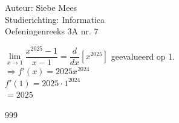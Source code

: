 \documentclass[a4paper]{article}
\begin{document}
  
\noindent \large Auteur: Siebe Mees \\
\noindent \large Studierichting: Informatica\\
\noindent \large Oefeningenreeks 3A nr. 7\\

\medskip

\normalsize

$ \lim\limits_{x \rightarrow 1} \dfrac{x^{2025} - 1}{x-1} = \dfrac{d}{dx} \left[ x^{2025} \right] $ geevalueerd op 1. \\

$ \Rightarrow f'(x) = 2025x^{2024} $ \\

$ f'(1) = 2025 \cdot 1^{2024} $ \\

$ = 2025 $ \\

\begin{thebibliography}{999}
\end{thebibliography}
\end{document}
